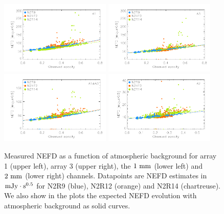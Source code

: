 \begin{figure}
\begin{center}
 \includegraphics[clip=true,width=0.47\textwidth]{Figures/NEFD/plot_nefd_vs_obstau_a1.pdf}
 \includegraphics[clip=true,width=0.47\textwidth]{Figures/NEFD/plot_nefd_vs_obstau_a3.pdf}
 \includegraphics[clip=true,width=0.47\textwidth]{Figures/NEFD/plot_nefd_vs_obstau_1mm.pdf}
 \includegraphics[clip=true,width=0.47\textwidth]{Figures/NEFD/plot_nefd_vs_obstau_a2.pdf}
 \caption[Measured NEFD versus observed opacity]{Measured NEFD as a function of atmospheric background for array 1 (upper left), array 3 (upper right), the $1~\rm{mm}$ (lower left) and $2~\rm{mm}$ (lower right) channels. Datapoints are NEFD estimates in $\rm{mJy}\cdot s^{0.5}$ for N2R9 (blue), N2R12 (orange) and N2R14 (chartreuse). We also show in the plots the expected NEFD evolution with atmospheric background as solid curves.}
\label{fig:nefdvsbackground}
\end{center}
\end{figure}
 
